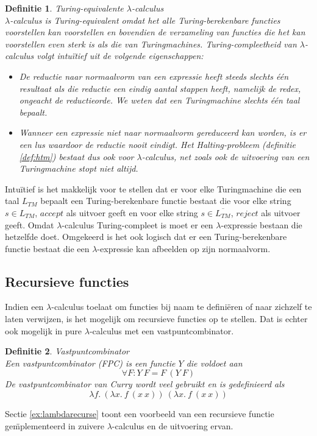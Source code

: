 \documentclass[a4paper]{article}
\newtheorem{tdefinitie}{Definitie}[section]
\newenvironment{definitie}[1]%
  {\begin{mdframed}[backgroundcolor=silver,
    topline=false,
    rightline=false,
    leftline=false,
    bottomline=false]\begin{tdefinitie}#1\\\normalfont}%
  {\end{tdefinitie}\end{mdframed}}
\begin{document}
\begin{definitie}{Turing-equivalente $\lambda$-calculus}
  \label{def:tmlambda}
  $\lambda$-calculus is Turing-equivalent omdat het alle Turing-berekenbare functies voorstellen kan voorstellen en bovendien de verzameling van functies die het kan voorstellen even sterk is als die van Turingmachines. Turing-compleetheid van $\lambda$-calculus volgt intu\"itief uit de volgende eigenschappen:
  \begin{itemize}
  \item De reductie naar normaalvorm van een expressie heeft steeds slechts \'e\'en resultaat als die reductie een eindig aantal stappen heeft, namelijk de redex, ongeacht de reductieorde. We weten dat een Turingmachine slechts \'e\'en taal bepaalt.
  \item Wanneer een expressie niet naar normaalvorm gereduceerd kan worden, is er een lus waardoor de reductie nooit eindigt. Het Halting-probleem (definitie \ref{def:htm}) bestaat dus ook voor $\lambda$-calculus, net zoals ook de uitvoering van een Turingmachine stopt niet altijd.
  \end{itemize}
\end{definitie}

Intu\"itief is het makkelijk voor te stellen dat er voor elke Turingmachine die een taal $L_{TM}$ bepaalt een Turing-berekenbare functie bestaat die voor elke string $s \in L_{TM}$, $accept$ als uitvoer geeft en voor elke string $s \in \overline{L_{TM}}$, $reject$ als uitvoer geeft. Omdat $\lambda$-calculus Turing-compleet is moet er een $\lambda$-expressie bestaan die hetzelfde doet. Omgekeerd is het ook logisch dat er een Turing-berekenbare functie bestaat die een $\lambda$-expressie kan afbeelden op zijn normaalvorm.

\subsection{Recursieve functies}

Indien een $\lambda$-calculus toelaat om functies bij naam te defini\"eren of naar zichzelf te laten verwijzen, is het mogelijk om recursieve functies op te stellen. Dat is echter ook mogelijk in pure $\lambda$-calculus met een vastpuntcombinator.

\begin{definitie}{Vastpuntcombinator}
  Een vastpuntcombinator (FPC) is een functie $Y$ die voldoet aan
  \begin{equation*}
  \forall F: Y\ F = F\ (Y\ F)
  \end{equation*}
  De vastpuntcombinator van Curry wordt veel gebruikt en is gedefinieerd als
  \begin{equation*}
  \lambda f.\ (\lambda x.\ f\ (x\ x))\ (\lambda x.\ f\ (x\ x))
  \end{equation*}
\end{definitie}

Sectie \ref{ex:lambdarecurse} toont een voorbeeld van een recursieve functie ge\"mplementeerd in zuivere $\lambda$-calculus en de uitvoering ervan.




\end{document}
